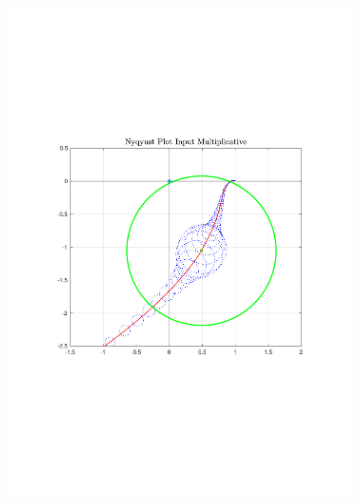 \documentclass[a4paper, 12pt]{article}
\begin{document}
\begin{figure}[h!]{}
\begin{subfigure}[t]{0.32\textwidth}
           \includegraphics[width=\textwidth]{Figures/fig10b.pdf}
           \label{fig:fig10b}
    \end{subfigure}
    \begin{subfigure}[t]{0.32\textwidth}

\end{subfigure}
\end{figure}
\end{document}
